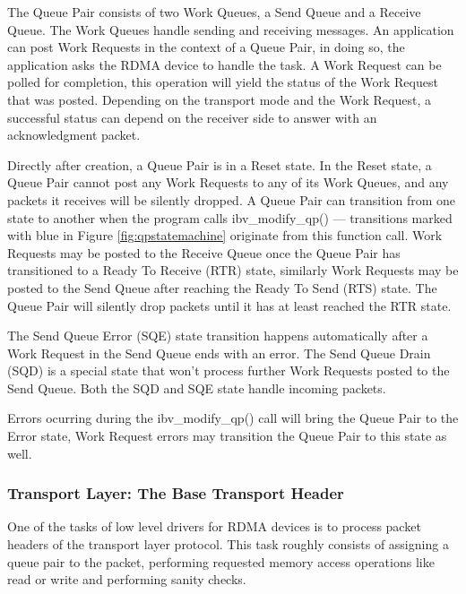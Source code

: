
The Queue Pair consists of two Work Queues, a Send Queue and a Receive
Queue. The Work Queues handle sending and receiving messages.
An application can post Work Requests in the context of a Queue Pair, in
doing so, the application asks the RDMA device to handle the task.
A Work Request can be polled for completion, this operation will yield
the status of the Work Request that was posted. Depending on the transport
mode and the Work Request, a successful status can depend on the receiver
side to answer with an acknowledgment packet.


Directly after creation, a Queue Pair is in a Reset state. In the Reset state,
a Queue Pair cannot post any Work Requests to any
of its Work Queues, and any packets it receives will be silently dropped.
A Queue Pair can transition from one state to another when the program calls ibv\_modify\_qp() ---
transitions marked with blue in Figure \ref{fig:qpstatemachine} originate from this function call.
Work Requests may be posted to the Receive Queue once the Queue Pair has transitioned to a Ready To Receive (RTR) state,
similarly Work Requests may be posted to the Send Queue after reaching the Ready To Send (RTS) state. The Queue Pair will silently drop
packets until it has at least reached the RTR state.

The Send Queue Error (SQE) state transition happens automatically
after a Work Request in the Send Queue ends with an error\cite{QPStateMachine2012}. The Send Queue Drain (SQD) is a special state
that won't process further Work Requests posted to the Send Queue\cite{QPStateMachine2012}. Both the SQD and SQE state handle incoming packets\cite{barakVerbsProgrammingTutorial2014}.

Errors ocurring during the ibv\_modify\_qp() call will bring the Queue Pair
to the Error state, Work Request errors may transition the Queue Pair to this state as well\cite{QPStateMachine2012}.


\subsubsection{Transport Layer: The Base Transport Header} %

One of the tasks of low level drivers for RDMA devices is to process
packet headers of the transport layer protocol. This task roughly consists
of assigning a queue pair to the packet, performing requested memory access operations like
read or write and performing sanity checks.

